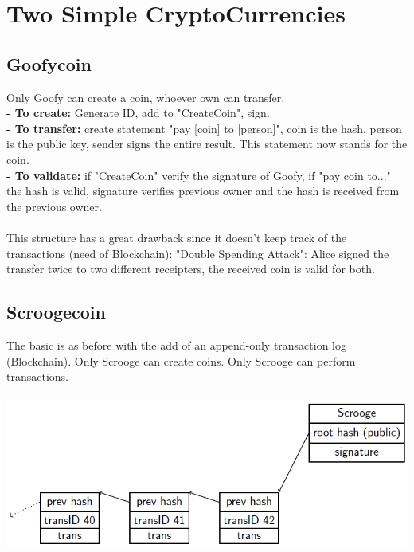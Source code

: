 \documentclass{article}
\begin{document}
\section{Two Simple CryptoCurrencies}
\subsection{Goofycoin}
Only Goofy can create a coin, whoever own can transfer.\\
\textbf{- To create: }Generate ID, add to "CreateCoin", sign.\\
\textbf{- To transfer: }create statement "pay [coin] to [person]", coin is the hash, person is the public key, sender signs the entire result. This statement now stands for the coin.\\
\textbf{- To validate: }if "CreateCoin" verify the signature of Goofy, if "pay coin to..." the hash is valid, signature verifies previous owner and the hash is received from the previous owner.\\\\
This structure has a great drawback since it doesn't keep track of the transactions (need of Blockchain): "Double Spending Attack": Alice signed the transfer twice to two different receipters, the received coin is valid for both.\\
\subsection{Scroogecoin}
The basic is as before with the add of an append-only transaction log (Blockchain). Only Scrooge can create coins. Only Scrooge can perform transactions.\\\\
\includegraphics[scale=0.6]{13.png}\\\\
\end{document}
